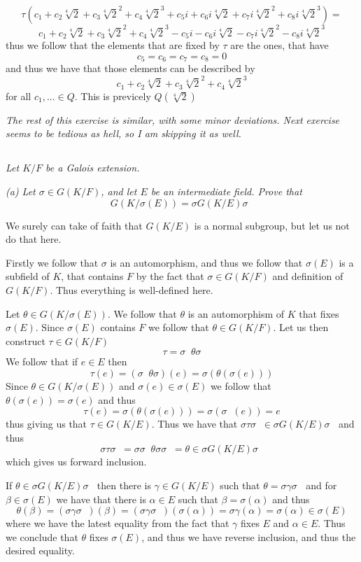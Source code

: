 \documentclass[11pt,oneside,titlepage]{book}
\DeclareMathOperator \inv {^{-1}}
\begin{document}
$$\tau(c_1 + c_2 \sqrt[4]{2} + c_3 \sqrt[4]{2}^2 + c_4 \sqrt[4]{2}^3 +
c_5 i + c_6 i\sqrt[4]{2} + c_7 i \sqrt[4]{2}^2 + c_8 i\sqrt[4]{2}^3) = $$
$$ c_1 + c_2 \sqrt[4]{2} + c_3 \sqrt[4]{2}^2 + c_4 \sqrt[4]{2}^3 -
c_5 i - c_6 i\sqrt[4]{2} - c_7 i \sqrt[4]{2}^2 - c_8 i\sqrt[4]{2}^3$$
thus we follow that the elements that are fixed by $\tau$ are the ones,
that have
$$c_5 = c_6 = c_7 = c_8 = 0$$
and thus we have that those elements can be described by
$$c_1 + c_2 \sqrt[4]{2} + c_3 \sqrt[4]{2}^2 + c_4 \sqrt[4]{2}^3$$
for all $c_1, ... \in Q$. This is previcely $Q(\sqrt[4]{2})$

\textit{The rest of this exercise is similar, with some minor
deviations. Next exercise seems to be tedious as hell, so I am
skipping it as well.}

\subsection{}

\textit{Let $K/F$ be a Galois extension.}

\textit{(a) Let $\sigma \in G(K/F)$, and let $E$ be an intermediate
  field. Prove that
  $$ G(K/\sigma(E)) = \sigma G(K/E)\sigma\inv$$}

We surely can take of faith that $G(K/E)$ is a normal subgroup, but
let us not do that here.

Firstly we follow that $\sigma$ is an automorphism, and thus we follow
that $\sigma(E)$ is a subfield of $K$, that contains $F$ by the fact
that $\sigma \in G(K/F)$ and definition of $G(K/F)$. Thus everything
is well-defined here. 

Let $\theta \in G(K/\sigma(E))$. We follow that $\theta$ is an
automorphism of $K$ that fixes $\sigma(E)$. Since $\sigma(E)$
contains $F$ we follow that $\theta \in G(K/F)$. Let us then construct
$\tau \in G(K/F)$
$$\tau = \sigma\inv \theta \sigma $$
We follow that if $e \in E$ then
$$\tau(e) = (\sigma\inv \theta \sigma)(e) = \sigma(\theta(\sigma(e)))$$
Since $\theta \in G(K/\sigma(E))$ and $\sigma(e) \in \sigma(E)$ we
follow that $\theta(\sigma(e)) = \sigma(e)$ and thus
$$\tau(e) = \sigma(\theta(\sigma(e))) = \sigma (\sigma\inv(e)) = e$$
thus giving us that $\tau \in G(K/E)$. Thus we have that
$\sigma \tau \sigma \inv \in \sigma G(K/E)\sigma\inv$ and thus
$$\sigma \tau \sigma\inv = \sigma \sigma \inv \theta \sigma \sigma \inv =
\theta \in \sigma G(K/E) \sigma\inv$$
which gives us forward inclusion.

If $\theta \in \sigma G(K/E)\sigma\inv$ then there is $\gamma \in
G(K/E)$ such that $\theta = \sigma \gamma \sigma\inv$ and for $\beta
\in \sigma(E)$ we have that there is $\alpha \in E$ such that $\beta =
\sigma(\alpha)$ and thus
$$\theta(\beta) = (\sigma \gamma \sigma \inv)(\beta) =
(\sigma \gamma \sigma \inv)(\sigma(\alpha)) = \sigma \gamma (\alpha) =
\sigma(\alpha) \in \sigma(E)$$ where we have the latest equality from
the fact that $\gamma$ fixes $E$ and $\alpha \in E$. Thus we conclude
that $\theta$ fixes $\sigma(E)$, and thus we have reverse inclusion,
and thus the desired equality.
\end{document}
